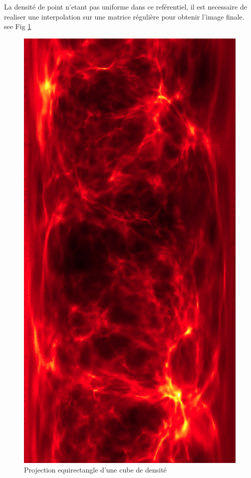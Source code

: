 La densité de point n'etant pas uniforme dans ce reférentiel, il est necessaire de realiser une interpolation sur une matrice régulière pour obtenir l'image finale. see Fig \ref{fig:equirectangle}


\begin{figure}[bth]
        \includegraphics[height=.95\textheight]{img/04/equi.png} 
        \caption{Projection equirectangle d'une cube de densité}
 		\label{fig:equirectangle}
\end{figure}

